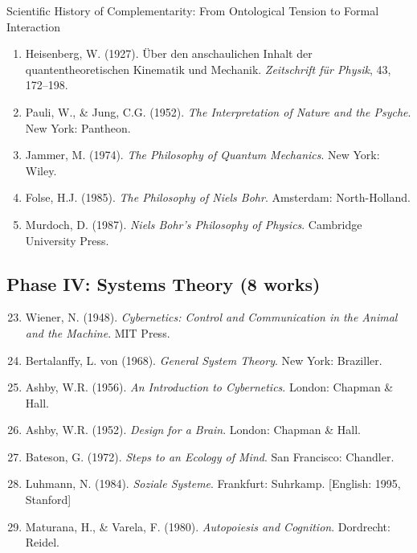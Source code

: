 \begin{chapter}{Scientific History of Complementarity: From Ontological Tension to Formal Interaction}
\begin{enumerate}
    \item Heisenberg, W. (1927). Über den anschaulichen Inhalt der quantentheoretischen Kinematik und Mechanik. \textit{Zeitschrift für Physik}, 43, 172--198.

    \item Pauli, W., \& Jung, C.G. (1952). \textit{The Interpretation of Nature and the Psyche}. New York: Pantheon.

    \item Jammer, M. (1974). \textit{The Philosophy of Quantum Mechanics}. New York: Wiley.

    \item Folse, H.J. (1985). \textit{The Philosophy of Niels Bohr}. Amsterdam: North-Holland.

    \item Murdoch, D. (1987). \textit{Niels Bohr's Philosophy of Physics}. Cambridge University Press.
\end{enumerate}

\subsection{Phase IV: Systems Theory (8 works)}

\begin{enumerate}
    \setcounter{enumi}{22}
    \item Wiener, N. (1948). \textit{Cybernetics: Control and Communication in the Animal and the Machine}. MIT Press.

    \item Bertalanffy, L. von (1968). \textit{General System Theory}. New York: Braziller.

    \item Ashby, W.R. (1956). \textit{An Introduction to Cybernetics}. London: Chapman \& Hall.

    \item Ashby, W.R. (1952). \textit{Design for a Brain}. London: Chapman \& Hall.

    \item Bateson, G. (1972). \textit{Steps to an Ecology of Mind}. San Francisco: Chandler.

    \item Luhmann, N. (1984). \textit{Soziale Systeme}. Frankfurt: Suhrkamp. [English: 1995, Stanford]

    \item Maturana, H., \& Varela, F. (1980). \textit{Autopoiesis and Cognition}. Dordrecht: Reidel.


\end{enumerate}
\end{chapter}
